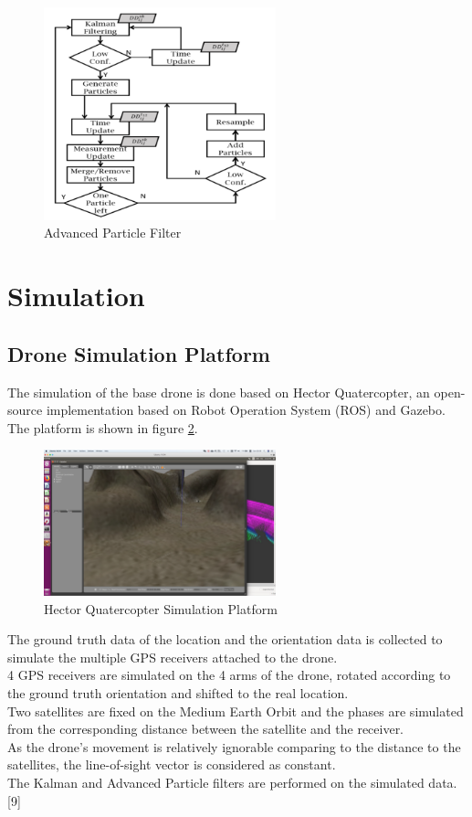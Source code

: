 \documentclass[journal,onecolumn]{IEEEtran}
\begin{document}
\begin{figure}
  \centering
  \captionsetup{justification=centering}
  \includegraphics[width=0.6\textwidth]{fig/APF.png}
  \caption{Advanced Particle Filter}
  \label{APF}
\end{figure}
\section{Simulation}
\subsection{Drone Simulation Platform}
The simulation of the base drone is done based on Hector Quatercopter, an open-source
implementation based on Robot Operation System (ROS) and Gazebo.
The platform is shown in figure \ref{hector}.\\
\begin{figure}
  \centering
  \captionsetup{justification=centering}
  \includegraphics[width=0.6\textwidth]{fig/hector.png}
  \caption{Hector Quatercopter Simulation Platform}
  \label{hector}
\end{figure}
The ground truth data of the location and the orientation data is collected to simulate the multiple GPS receivers attached to the drone.\\
4 GPS receivers are simulated on the 4 arms of the drone, rotated according to the ground truth orientation and shifted to the
real location.\\
Two satellites are fixed on the Medium Earth Orbit and the phases are simulated from the corresponding distance between the
satellite and the receiver.\\
As the drone’s movement is relatively ignorable comparing to the distance to the satellites, the line-of-sight vector is considered
as constant.\\
The Kalman and Advanced Particle filters are performed on the simulated data.[9]\\
\end{document}

